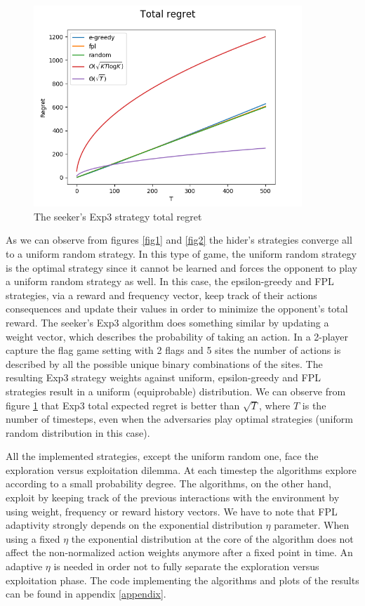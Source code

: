 \documentclass[runningheads]{llncs}
\begin{document}
\begin{figure}[!htb]
    \centering
\includegraphics[width=0.9\textwidth]{img/Figure_3b.png}
\caption{The seeker's Exp3 strategy total regret}\label{fig3}
\end{figure}

As we can observe from figures \ref{fig1} and \ref{fig2} the hider's
strategies converge all to a uniform random strategy. In this type of
game, the uniform random strategy is the optimal strategy since it
cannot be learned and forces the opponent to play a uniform random
strategy as well. In this case, the epsilon-greedy and FPL strategies,
via a reward and frequency vector, keep track of their actions
consequences and update their values in order to minimize the
opponent's total reward. The seeker's Exp3 algorithm does something
similar by updating a weight vector, which describes the probability
of taking an action. In a 2-player capture the flag game setting with 2
flags and 5 sites the number of actions is described by all the
possible unique binary combinations of the sites. The resulting Exp3
strategy weights against uniform, epsilon-greedy and FPL strategies
result in a uniform (equiprobable) distribution. We can observe from
figure \ref{fig3} that Exp3 total expected regret is better than
$\sqrt{T}$, where $T$ is the number of timesteps, even when the
adversaries play optimal strategies (uniform random distribution in
this case).

All the implemented strategies, except the uniform random
one, face the exploration versus exploitation dilemma. At each
timestep the algorithms explore according to a small probability
degree. The algorithms, on the other hand, exploit by keeping track of
the previous interactions with the environment by using weight,
frequency or reward history vectors. We have to note that FPL
adaptivity strongly depends on the exponential distribution $\eta$
parameter. When using a fixed $\eta$ the exponential distribution at
the core of the algorithm does not affect the non-normalized action
weights anymore after a fixed point in time. An adaptive $\eta$ is
needed in order not to fully
separate the exploration versus exploitation phase. The code
implementing the algorithms and plots of the results can be found in
appendix \ref{appendix}.
\end{document}
